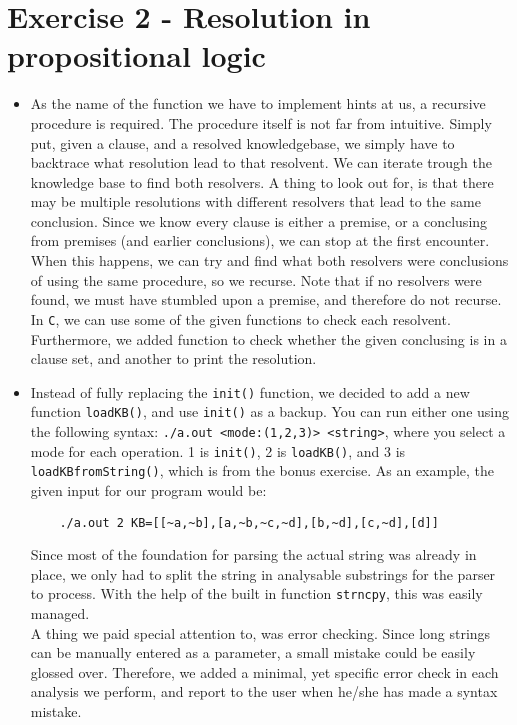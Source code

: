 \documentclass{report}
\begin{document}
\section*{Exercise 2 - Resolution in propositional logic}
\begin{itemize}
    \item As the name of the function we have to implement hints at us, a recursive procedure is required. The procedure itself is not far from intuitive. Simply put, given a clause, and a resolved knowledgebase, we simply have to backtrace what resolution lead to that resolvent. We can iterate trough the knowledge base to find both resolvers. A thing to look out for, is that there may be multiple resolutions with different resolvers that lead to the same conclusion. Since we know every clause is either a premise, or a conclusing from premises (and earlier conclusions), we can stop at the first encounter. When this happens, we can try and find what both resolvers were conclusions of using the same procedure, so we recurse. Note that if no resolvers were found, we must have stumbled upon a premise, and therefore do not recurse.\\
    In \verb|C|, we can use some of the given functions to check each resolvent. Furthermore, we added function to check whether the given conclusing is in a clause set, and another to print the resolution.
    \item Instead of fully replacing the \verb|init()| function, we decided to add a new function \verb|loadKB()|, and use \verb|init()| as a backup. You can run either one using the following syntax: \verb|./a.out <mode:(1,2,3)> <string>|, where you select a mode for each operation. 1 is \verb|init()|, 2 is \verb|loadKB()|, and 3 is \verb|loadKBfromString()|, which is from the bonus exercise. As an example, the given input for our program would be: 
    \begin{verbatim}
    ./a.out 2 KB=[[~a,~b],[a,~b,~c,~d],[b,~d],[c,~d],[d]]
    \end{verbatim} 
    Since most of the foundation for parsing the actual string was already in place, we only had to split the string in analysable substrings for the parser to process. With the help of the built in function \verb|strncpy|, this was easily managed.\\
    A thing we paid special attention to, was error checking. Since long strings can be manually entered as a parameter, a small mistake could be easily glossed over. Therefore, we added a minimal, yet specific error check in each analysis we perform, and report to the user when he/she has made a syntax mistake.\\

\end{itemize}
\end{document}
